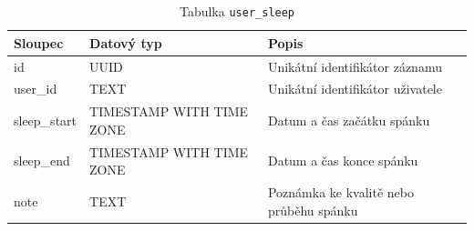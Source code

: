 \begin{table}[ht!]
    \centering
    \begin{tabularx}{\textwidth}{|l|l|L|}
        \hline
        \textbf{Sloupec} & \textbf{Datový typ}      & \textbf{Popis}                          \\ \hline
        id               & UUID                     & Unikátní identifikátor záznamu          \\ \hline
        user\_id         & TEXT                     & Unikátní identifikátor uživatele        \\ \hline
        sleep\_start     & TIMESTAMP WITH TIME ZONE & Datum a čas začátku spánku              \\ \hline
        sleep\_end       & TIMESTAMP WITH TIME ZONE & Datum a čas konce spánku                \\ \hline
        note             & TEXT                     & Poznámka ke kvalitě nebo průběhu spánku \\ \hline
    \end{tabularx}
    \caption{Tabulka \texttt{user\_sleep}}
    \label{tab:user_sleep}
\end{table}
